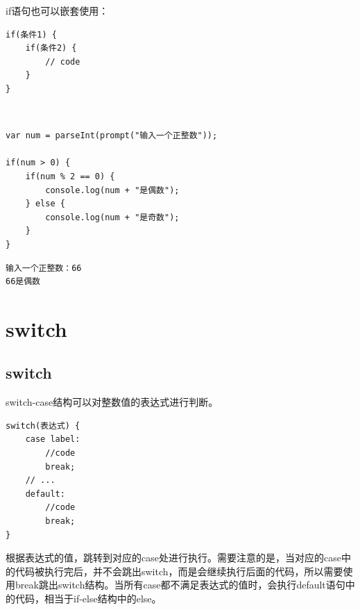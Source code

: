 if语句也可以嵌套使用：\\

\begin{lstlisting}[style=htmlcssjs]
if(条件1) {
    if(条件2) {
        // code
    }
}
\end{lstlisting}

\vspace{0.5cm}

\\

\begin{lstlisting}[style=htmlcssjs]
var num = parseInt(prompt("输入一个正整数"));

if(num > 0) {
    if(num % 2 == 0) {
        console.log(num + "是偶数");
    } else {
        console.log(num + "是奇数");
    }
}
\end{lstlisting}

\begin{tcolorbox}
	\begin{verbatim}
输入一个正整数：66
66是偶数
	\end{verbatim}
\end{tcolorbox}

\newpage

\section{switch}

\subsection{switch}

switch-case结构可以对整数值的表达式进行判断。\\

\begin{lstlisting}[style=htmlcssjs]
switch(表达式) {
    case label:
        //code
        break;
    // ...
    default:
        //code
        break;
}
\end{lstlisting}

根据表达式的值，跳转到对应的case处进行执行。需要注意的是，当对应的case中的代码被执行完后，并不会跳出switch，而是会继续执行后面的代码，所以需要使用break跳出switch结构。当所有case都不满足表达式的值时，会执行default语句中的代码，相当于if-else结构中的else。\\

\\

